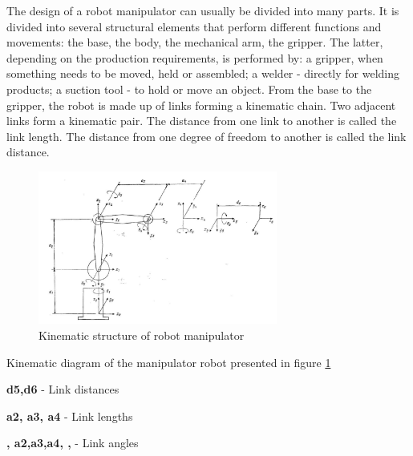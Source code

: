 The design of a robot manipulator can usually be divided into many parts.
It is divided into several structural elements that perform different functions and movements: the base, the body, the mechanical arm, the gripper. The latter, depending on the production requirements, is performed by: a gripper, when something needs to be moved, held or assembled; a welder - directly for welding products; a suction tool - to hold or move an object. From the base to the gripper, the robot is made up of links forming a kinematic chain. Two adjacent links form a kinematic pair. The distance from one link to another is called the link length. The distance from one degree of freedom to another is called the link distance. 


\begin{figure}[H]
	\centering
	\includegraphics[width=0.7\textwidth]{Src/images/KinStr.png}
	\caption{Kinematic structure of robot manipulator}
    \label{kinematic1}
\end{figure}

Kinematic diagram of the manipulator robot presented in figure \ref{kinematic1} 

\textbf{d5,d6} - Link distances 

\textbf{a2, a3, a4} - Link lengths 

\textbf{ , \phi a2,\phi  a3,\phi a4,  ,} - Link angles